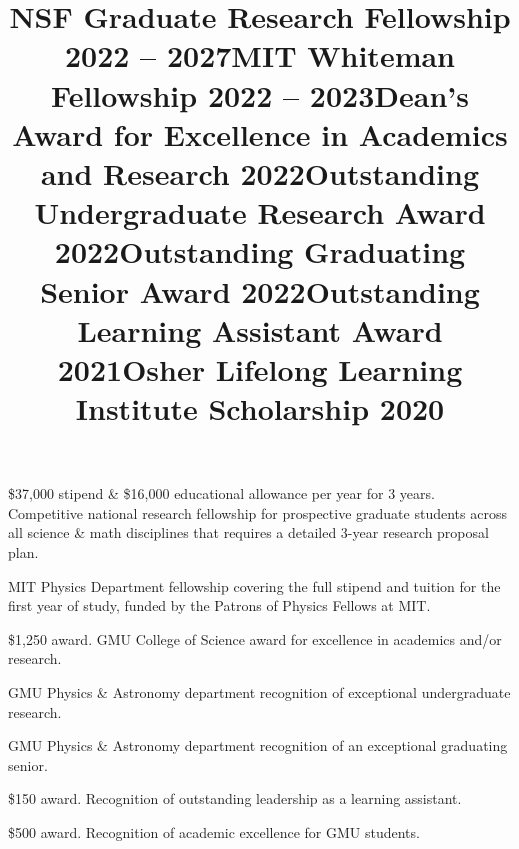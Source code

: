 \documentclass[marg, centered]{res}
\begin{document}
\begin{resume}
\title{\textbf{NSF Graduate Research Fellowship} \hfill \textbf{2022 -- 2027}}
\begin{position}
\$37,000 stipend \& \$16,000 educational allowance per year for 3 years. Competitive national research fellowship for prospective graduate students across all science \& math disciplines that requires a detailed 3-year research proposal plan.
\end{position}

\vspace{-0.3cm}
\title{\textbf{MIT Whiteman Fellowship} \hfill \textbf{2022 -- 2023}}
\begin{position}
MIT Physics Department fellowship covering the full stipend and tuition for the first year of study, funded by the Patrons of Physics Fellows at MIT.
\end{position}

\vspace{-0.3cm}
\title{\textbf{Dean's Award for Excellence in Academics and Research} \hfill {\textbf{2022}}}
\begin{position}
\$1,250 award.  GMU College of Science award for excellence in academics and/or research.
\end{position}

\vspace{-0.3cm}
\title{\textbf{Outstanding Undergraduate Research Award} \hfill \textbf{2022}}
\begin{position}
GMU Physics \& Astronomy department recognition of exceptional undergraduate research.
\end{position}

\vspace{-0.3cm}
\title{\textbf{Outstanding Graduating Senior Award} \hfill \textbf{2022}}
\begin{position}
GMU Physics \& Astronomy department recognition of an exceptional graduating senior.
\end{position}

\vspace{-0.3cm}
\title{\textbf{Outstanding Learning Assistant Award} \hfill \textbf{2021}}
\begin{position}
\$150 award.  Recognition of outstanding leadership as a learning assistant.
\end{position}

\vspace{-0.3cm}
\title{\textbf{Osher Lifelong Learning Institute Scholarship} \hfill \textbf{2020}}
\begin{position}
\$500 award.  Recognition of academic excellence for GMU students.
\end{position}


\end{resume}
\end{document}
